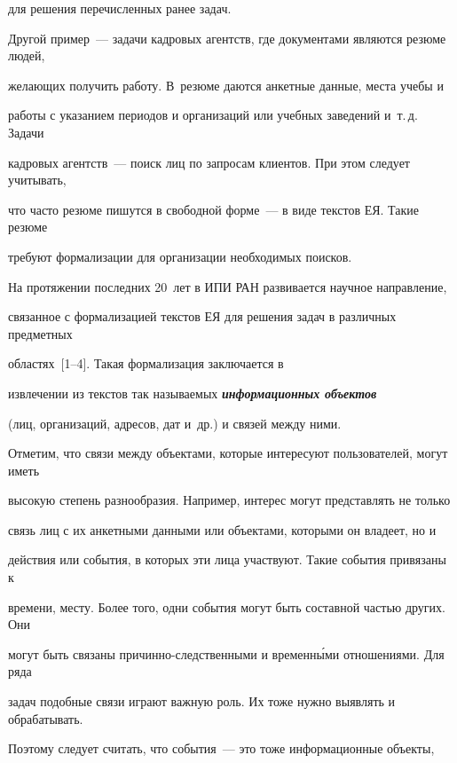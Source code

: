 для решения перечисленных ранее задач.    





 Другой пример~--- задачи кадровых агентств, где документами являются резюме людей, 


желающих получить работу. В~резюме даются анкетные данные, места учебы и 


работы с указанием периодов и организаций или учебных заведений и~т.\,д. Задачи 


кадровых агентств~--- поиск лиц по запросам клиентов. При этом следует учитывать, 


что часто резюме пишутся в свободной форме~--- в виде текстов ЕЯ. Такие резюме 


требуют формализации для организации необходимых поисков.   





         На протяжении последних 20~лет в ИПИ РАН развивается научное на\-прав\-ле\-ние, 


связанное с формализацией текстов ЕЯ для решения задач в различных предметных 


областях~[1--4]. Такая формализация заключается в 


извлечении из текстов так называемых {\bfseries\textit{информационных объектов}}  


(лиц, организаций, адресов, дат и~др.) и связей между ними.


 


Отметим, что связи между объектами, которые интересуют пользователей, могут иметь 


высокую степень разнообразия. Например, интерес могут пред\-став\-лять не только 


связь лиц с их анкетными данными или объектами, которыми он владеет, но и 


действия или события, в которых эти лица участвуют. Такие события привязаны к 


времени, месту.  Более того, одни события могут быть составной частью других. Они 


могут быть связаны причинно-следственными и временн\'{ы}ми отношениями. Для ряда 


задач подобные связи играют важную роль. Их тоже нужно выявлять и обрабатывать. 


Поэтому следует считать, что события~--- это тоже информационные объекты, 


